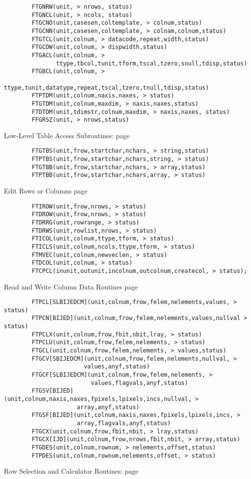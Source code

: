 \documentclass[11pt]{book}
\begin{document}
\begin{verbatim}
        FTGNRW(unit, > nrows, status)
        FTGNCL(unit, > ncols, status)
        FTGCNO(unit,casesen,coltemplate, > colnum,status)
        FTGCNN(unit,casesen,coltemplate, > colnam,colnum,status)
        FTGTCL(unit,colnum, > datacode,repeat,width,status)
        FTGCDW(unit,colnum, > dispwidth,status)
        FTGACL(unit,colnum, >
               ttype,tbcol,tunit,tform,tscal,tzero,snull,tdisp,status)
        FTGBCL(unit,colnum, >
               ttype,tunit,datatype,repeat,tscal,tzero,tnull,tdisp,status)
        FTPTDM(unit,colnum,naxis,naxes, > status)
        FTGTDM(unit,colnum,maxdim, > naxis,naxes,status)
        FTDTDM(unit,tdimstr,colnum,maxdim, > naxis,naxes, status)
        FFGRSZ(unit, > nrows,status)
\end{verbatim}
 Low-Level Table Access Subroutines: page~\pageref{FTGTBS}

\begin{verbatim}
        FTGTBS(unit,frow,startchar,nchars, > string,status)
        FTPTBS(unit,frow,startchar,nchars,string, > status)
        FTGTBB(unit,frow,startchar,nchars, > array,status)
        FTPTBB(unit,frow,startchar,nchars,array, > status)
\end{verbatim}
 Edit Rows or Columns page~\pageref{FTIROW}

\begin{verbatim}
        FTIROW(unit,frow,nrows, > status)
        FTDROW(unit,frow,nrows, > status)
        FTDRRG(unit,rowrange, > status)
        FTDRWS(unit,rowlist,nrows, > status)
        FTICOL(unit,colnum,ttype,tform, > status)
        FTICLS(unit,colnum,ncols,ttype,tform, > status)
        FTMVEC(unit,colnum,newveclen, > status)
        FTDCOL(unit,colnum, > status)
        FTCPCL(inunit,outunit,incolnum,outcolnum,createcol, > status);
\end{verbatim}
 Read and Write Column Data Routines page~\pageref{FTPCLS}

\begin{verbatim}
        FTPCL[SLBIJEDCM](unit,colnum,frow,felem,nelements,values, > status)
        FTPCN[BIJED](unit,colnum,frow,felem,nelements,values,nullval > status)
        FTPCLX(unit,colnum,frow,fbit,nbit,lray, > status)
        FTPCLU(unit,colnum,frow,felem,nelements, > status)
        FTGCL(unit,colnum,frow,felem,nelements, > values,status)
        FTGCV[SBIJEDCM](unit,colnum,frow,felem,nelements,nullval, >
                       values,anyf,status)
        FTGCF[SLBIJEDCM](unit,colnum,frow,felem,nelements, >
                         values,flagvals,anyf,status)
        FTGSV[BIJED](unit,colnum,naxis,naxes,fpixels,lpixels,incs,nullval, >
                     array,anyf,status)
        FTGSF[BIJED](unit,colnum,naxis,naxes,fpixels,lpixels,incs, >
                     array,flagvals,anyf,status)
        FTGCX(unit,colnum,frow,fbit,nbit, > lray,status)
        FTGCX[IJD](unit,colnum,frow,nrows,fbit,nbit, > array,status)
        FTGDES(unit,colnum,rownum, > nelements,offset,status)
        FTPDES(unit,colnum,rownum,nelements,offset, > status)
\end{verbatim}
 Row Selection and Calculator Routines: page~\pageref{FTFROW}
\end{document}
